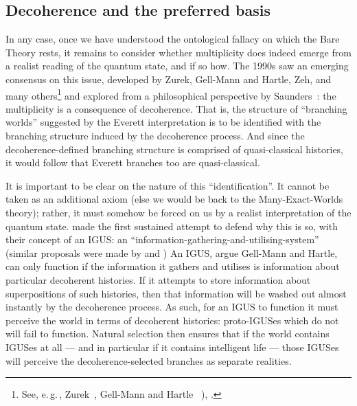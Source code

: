 \documentclass[12pt]{article}
\newcommand{\egc}{\mbox{e.\,g.\,}}
\begin{document}
\subsection{Decoherence and the preferred basis}\label{DMWWeverettdecoherence}

In any case, once we have understood the ontological fallacy on which the Bare Theory rests, it remains to consider whether multiplicity does indeed emerge from a realist reading of the quantum state, and if so how. The 1990s saw an emerging consensus on this issue, developed  by Zurek, Gell-Mann and Hartle, Zeh, and many others\footnote{See, \egc, Zurek~\citeyear{zurek91,zurekroughguide}, Gell-Mann and Hartle~ \citeyear{gellmannhartle,gellmannhartle93}), .}  and explored from a philosophical perspective by Saunders~\citeyear{saundersevolution,saundersmetaphysics,saundersdecoherence}: the multiplicity is a consequence of decoherence.  That is, the structure of ``branching worlds'' suggested by the Everett interpretation is to be identified with the branching structure induced by the decoherence process. And since the decoherence-defined branching structure is comprised of quasi-classical histories, it would follow that Everett branches too are quasi-classical. 

It is important to be clear on the nature of this ``identification''. It cannot be taken as an additional axiom (else we would be back to the Many-Exact-Worlds theory); rather, it must somehow be forced on us by a realist interpretation of the quantum state.  made the first sustained attempt to defend why this is so, with their concept of an IGUS: an ``information-gathering-and-utilising-system'' (similar proposals were made by  and ) An IGUS, argue Gell-Mann and Hartle, can only function if the information it gathers and utilises is information about particular decoherent histories. If it attempts to store information about superpositions of such histories, then that information will be washed out almost instantly by the decoherence process. As such, for an IGUS to function it must perceive the world in terms of decoherent histories: proto-IGUSes which do not will fail to function. Natural selection then ensures that if the world contains IGUSes at all --- and in particular if it contains intelligent life --- those IGUSes will perceive the decoherence-selected branches as separate realities.
\end{document}
